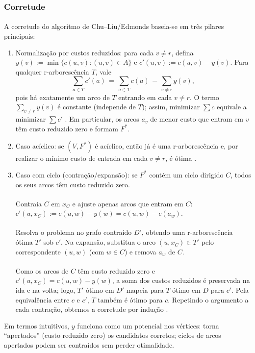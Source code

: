 \documentclass[12pt,a4paper]{article}
\def\emph#1{#1}%
\begin{document}
\subsubsection{Corretude}
\paragraph{}
A corretude do algoritmo de Chu–Liu/Edmonds baseia-se em três pilares principais:
\begin{enumerate}\setlength{\itemsep}{2pt}
    \item \emph{Normalização por custos reduzidos:} para cada \(v\neq r\), defina \(y(v):=\min\{c(u,v):(u,v)\in A\}\) e \(c'(u,v):=c(u,v)-y(v)\). Para qualquer r-arborescência \(T\), vale
          \[
              \sum_{a\in T} c'(a) \,=\, \sum_{a\in T} c(a) \, - \, \sum_{v\neq r} y(v),
          \]
          pois há exatamente um arco de \(T\) entrando em cada \(v\neq r\). O termo \(\sum_{v\neq r} y(v)\) é constante (independe de \(T\)); assim, minimizar \(\sum c\) equivale a minimizar \(\sum c'\) \cite[Obs.~4.37]{kleinberg2006}. Em particular, os arcos \(a_v\) de menor custo que entram em \(v\) têm custo reduzido zero e formam \(F^*\).
    \item \emph{Caso acíclico:} se \((V,F^*)\) é acíclico, então já é uma r-arborescência e, por realizar o mínimo custo de entrada em cada \(v\neq r\), é ótima \cite[Obs.~4.36]{kleinberg2006}.
    \item \emph{Caso com ciclo (contração/expansão):} se \(F^*\) contém um ciclo dirigido \(C\), todos os seus arcos têm custo reduzido zero.
          \paragraph{}
          Contraia \(C\) em \(x_C\) e ajuste apenas arcos que \emph{entram} em \(C\): \(c'(u,x_C):=c(u,w)-y(w)=c(u,w)-c(a_w)\).
          \paragraph{}
          Resolva o problema no grafo contraído \(D'\), obtendo uma r-arborescência ótima \(T'\) sob \(c'\). Na expansão, substitua o arco \((u,x_C)\in T'\) pelo correspondente \((u,w)\) (com \(w\in C\)) e remova \(a_w\) de \(C\).
          \paragraph{}
          Como os arcos de \(C\) têm custo reduzido zero e \(c'(u,x_C)=c(u,w)-y(w)\), a soma dos custos reduzidos é preservada na ida e na volta; logo, \(T'\) ótimo em \(D'\) mapeia para \(T\) ótimo em \(D\) para \(c'\). Pela equivalência entre \(c\) e \(c'\), \(T\) também é ótimo para \(c\). Repetindo o argumento a cada contração, obtemos a corretude por indução \cite[Sec.~4.9]{kleinberg2006,schrijver2003comb}.
\end{enumerate}
Em termos intuitivos, \(y\) funciona como um potencial nos vértices: torna “apertados” (custo reduzido zero) os candidatos corretos; ciclos de arcos apertados podem ser contraídos sem perder otimalidade.
\end{document}
